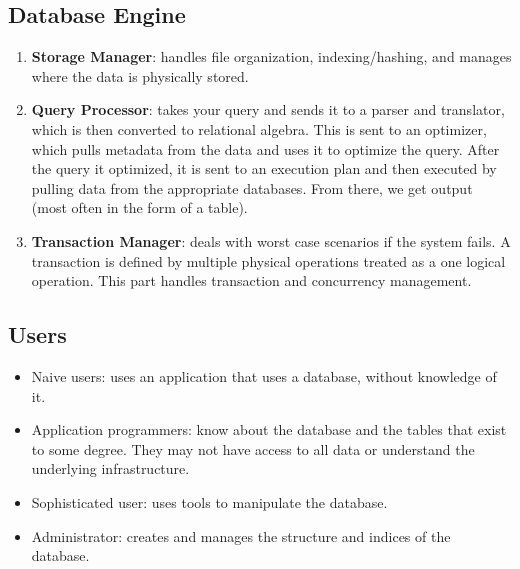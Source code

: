 \documentclass{math}
\begin{document}
\subsection*{Database Engine}
\begin{enumerate}
  \item \textbf{Storage Manager}: handles file organization, indexing/hashing,
    and manages where the data is physically stored.
  \item \textbf{Query Processor}: takes your query and sends it to a parser and
    translator, which is then converted to relational algebra. This is
    sent to an optimizer, which pulls metadata from the data and uses it to
    optimize the query. After the query it optimized, it is sent to an
    execution plan and then executed by pulling data from the appropriate
    databases. From there, we get output (most often in the form of a table).
  \item \textbf{Transaction Manager}: deals with worst case scenarios if the
    system fails. A transaction is defined by multiple physical operations
    treated as a one logical operation. This part handles transaction and
    concurrency management.
\end{enumerate}

\subsection*{Users}
\begin{itemize}
  \item Naive users: uses an application that uses a database, without
    knowledge of it.
  \item Application programmers: know about the database and the tables that
    exist to some degree. They may not have access to all data or understand
    the underlying infrastructure.
  \item Sophisticated user: uses tools to manipulate the database.
  \item Administrator: creates and manages the structure and indices of the
    database.
\end{itemize}
\end{document}

